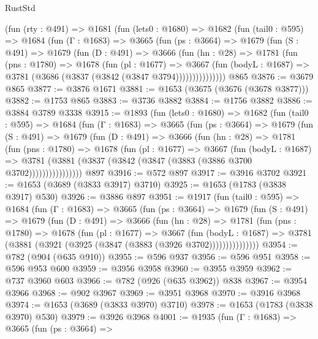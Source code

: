 \begin{lexlean}{RustStd}
\begin{coremodule}
    (fun (rty : @491) =>
    @1681
      (fun (lets0 : @1680) =>
      @1682
        (fun (tail0 : @595) =>
        @1684
          (fun (Γ : @1683) =>
          @3665
            (fun (ps : @3664) =>
            @1679
              (fun (S : @491) =>
              @1679
                (fun (D : @491) =>
                @3666
                  (fun (hn : @28) =>
                  @1781
                    (fun (pns : @1780) =>
                    @1678
                      (fun (pl : @1677) =>
                      @3667
                        (fun (bodyL : @1687) =>
                        @3781 (@3686 (@3837 (@3842 (@3847 @3794)))))))))))))))
    @865
@3876 := @3679 @865
@3877 := @3876 @1671
@3881 := @1653 (@3675 (@3676 (@3678 @3877)))
@3882 := @1753 @865
@3883 := @3736 @3882
@3884 := @1756 @3882
@3886 := @3884 @3789 @3338
@3915 := @1893
    (fun (lets0 : @1680) =>
    @1682
      (fun (tail0 : @595) =>
      @1684
        (fun (Γ : @1683) =>
        @3665
          (fun (ps : @3664) =>
          @1679
            (fun (S : @491) =>
            @1679
              (fun (D : @491) =>
              @3666
                (fun (hn : @28) =>
                @1781
                  (fun (pns : @1780) =>
                  @1678
                    (fun (pl : @1677) =>
                    @3667
                      (fun (bodyL : @1687) =>
                      @3781 (@3881 (@3837 (@3842 (@3847 (@3883 (@3886 @3700 @3702))))))))))))))))
    @897
@3916 := @572 @897
@3917 := @3916 @3702
@3921 := @1653 (@3689 (@3833 @3917) @3710)
@3925 := @1653 (@1783 (@3838 @3917) @530)
@3926 := @3886 @897
@3951 := @1917
    (fun (tail0 : @595) =>
    @1684
      (fun (Γ : @1683) =>
      @3665
        (fun (ps : @3664) =>
        @1679
          (fun (S : @491) =>
          @1679
            (fun (D : @491) =>
            @3666
              (fun (hn : @28) =>
              @1781
                (fun (pns : @1780) =>
                @1678
                  (fun (pl : @1677) =>
                  @3667
                    (fun (bodyL : @1687) =>
                    @3781 (@3881 (@3921 (@3925 (@3847 (@3883 (@3926 @3702)))))))))))))))
@3954 := @782 (@904 (@635 @910))
@3955 := @596 @937
@3956 := @596 @951
@3958 := @596 @953 @600
@3959 := @3956 @3958
@3960 := @3955 @3959
@3962 := @737 @3960 @603
@3966 := @782 (@926 (@635 @3962)) @838
@3967 := @3954 @3966
@3968 := @902 @3967
@3969 := @3951 @3968
@3970 := @3916 @3968
@3974 := @1653 (@3689 (@3833 @3970) @3710)
@3978 := @1653 (@1783 (@3838 @3970) @530)
@3979 := @3926 @3968
@4001 := @1935
    (fun (Γ : @1683) =>
    @3665
      (fun (ps : @3664) =>

\end{coremodule}
\end{lexlean}
